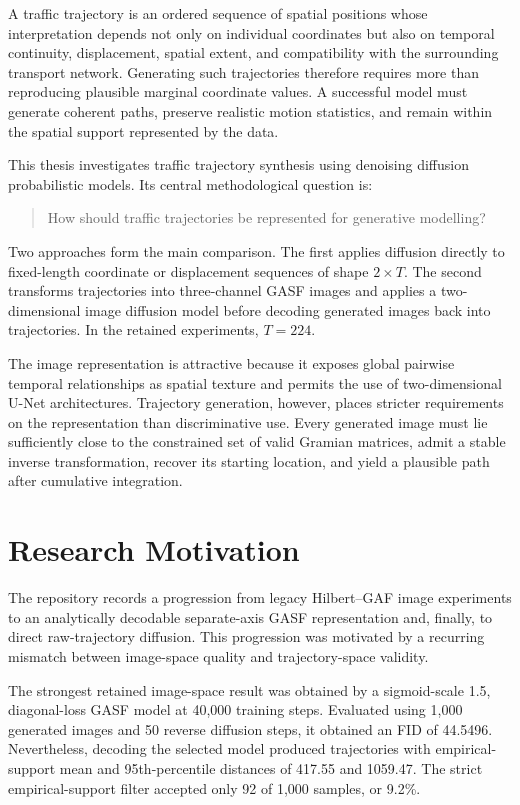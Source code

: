 \documentclass[12pt,a4paper,oneside]{report}
\begin{document}
A traffic trajectory is an ordered sequence of spatial positions whose interpretation depends not only on individual coordinates but also on temporal continuity, displacement, spatial extent, and compatibility with the surrounding transport network. Generating such trajectories therefore requires more than reproducing plausible marginal coordinate values. A successful model must generate coherent paths, preserve realistic motion statistics, and remain within the spatial support represented by the data.

This thesis investigates traffic trajectory synthesis using denoising diffusion probabilistic models. Its central methodological question is:

\begin{quote}
How should traffic trajectories be represented for generative modelling?
\end{quote}

Two approaches form the main comparison. The first applies diffusion directly to fixed-length coordinate or displacement sequences of shape $2\times T$. The second transforms trajectories into three-channel GASF images and applies a two-dimensional image diffusion model before decoding generated images back into trajectories. In the retained experiments, $T=224$.

The image representation is attractive because it exposes global pairwise temporal relationships as spatial texture and permits the use of two-dimensional U-Net architectures. Trajectory generation, however, places stricter requirements on the representation than discriminative use. Every generated image must lie sufficiently close to the constrained set of valid Gramian matrices, admit a stable inverse transformation, recover its starting location, and yield a plausible path after cumulative integration.

\section{Research Motivation}

The repository records a progression from legacy Hilbert--GAF image experiments to an analytically decodable separate-axis GASF representation and, finally, to direct raw-trajectory diffusion. This progression was motivated by a recurring mismatch between image-space quality and trajectory-space validity.

The strongest retained image-space result was obtained by a sigmoid-scale 1.5, diagonal-loss GASF model at 40,000 training steps. Evaluated using 1,000 generated images and 50 reverse diffusion steps, it obtained an FID of 44.5496. Nevertheless, decoding the selected model produced trajectories with empirical-support mean and 95th-percentile distances of 417.55 and 1059.47. The strict empirical-support filter accepted only 92 of 1,000 samples, or 9.2\%.
\end{document}
